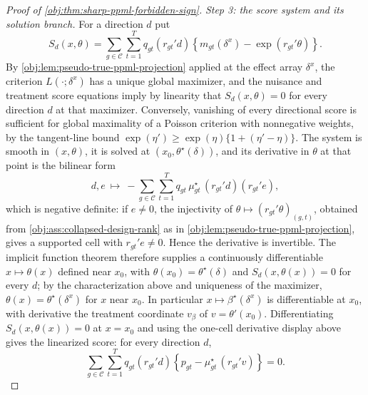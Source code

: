 \begin{proof}[Proof of \cref{obj:thm:sharp-ppml-forbidden-sign}]
\textit{Step 3: the score system and its solution branch.} For a direction \(d\) put
\[
S_d(x,\theta)
=
\sum_{g\in\mathcal C}\sum_{t=1}^T q_{gt}(r_{gt}'d)\left\{m_{gt}(\delta^x)-\exp(r_{gt}'\theta)\right\}.
\]
By \cref{obj:lem:pseudo-true-ppml-projection} applied at the effect array \(\delta^x\), the criterion \(L(\cdot;\delta^x)\) has a unique global maximizer, and the nuisance and treatment score equations imply by linearity that \(S_d(x,\theta)=0\) for every direction \(d\) at that maximizer. Conversely, vanishing of every directional score is sufficient for global maximality of a Poisson criterion with nonnegative weights, by the tangent-line bound \(\exp(\eta')\ge\exp(\eta)\{1+(\eta'-\eta)\}\).
The system is smooth in \((x,\theta)\), it is solved at \((x_0,\theta^\star(\delta))\), and its derivative in \(\theta\) at that point is the bilinear form
\[
d,e\ \mapsto\ -\sum_{g\in\mathcal C}\sum_{t=1}^T q_{gt}\,\mu^\star_{gt}\,(r_{gt}'d)(r_{gt}'e),
\]
which is negative definite: if \(e\neq0\), the injectivity of \(\theta\mapsto(r_{gt}'\theta)_{(g,t)}\), obtained from \cref{obj:ass:collapsed-design-rank} as in \cref{obj:lem:pseudo-true-ppml-projection}, gives a supported cell with \(r_{gt}'e\neq0\). Hence the derivative is invertible. The implicit function theorem therefore supplies a continuously differentiable \(x\mapsto\theta(x)\) defined near \(x_0\), with \(\theta(x_0)=\theta^\star(\delta)\) and \(S_d(x,\theta(x))=0\) for every \(d\); by the characterization above and uniqueness of the maximizer, \(\theta(x)=\theta^\star(\delta^x)\) for \(x\) near \(x_0\). In particular \(x\mapsto\beta^\star(\delta^x)\) is differentiable at \(x_0\), with derivative the treatment coordinate \(v_\beta\) of \(v=\theta'(x_0)\).
Differentiating \(S_d(x,\theta(x))=0\) at \(x=x_0\) and using the one-cell derivative display above gives the linearized score: for every direction \(d\),
\[
\sum_{g\in\mathcal C}\sum_{t=1}^T
q_{gt}(r_{gt}'d)
\left\{
p_{gt}-\mu^\star_{gt}\,(r_{gt}'v)
\right\}=0 .
\]


\end{proof}
